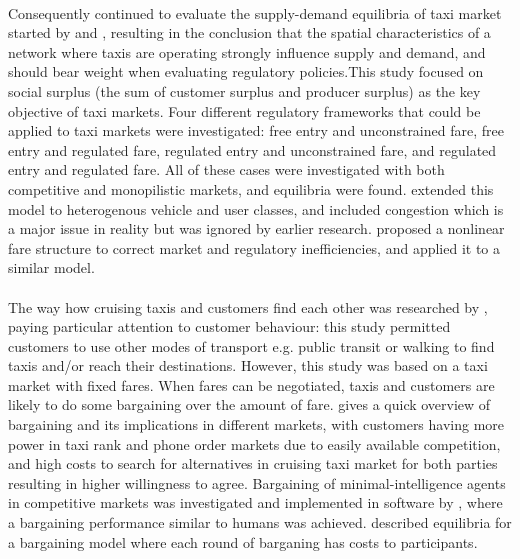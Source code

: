 \paragraph{}Consequently \textcite{Yang2002taxi+demand} continued to evaluate
the supply-demand equilibria of taxi market started by
\textcite{Yang1998taxi+network} and \textcite{Yang2000taxi+utilization},
resulting in the conclusion that the spatial characteristics of a network where
taxis are operating strongly influence supply and demand, and should bear
weight when evaluating regulatory policies.This study focused on social surplus
(the sum of customer surplus and producer surplus) as the key objective of taxi
markets. Four different regulatory frameworks that could be applied to taxi
markets were investigated: free entry and unconstrained fare, free entry and
regulated fare, regulated entry and unconstrained fare, and regulated entry and
regulated fare. All of these cases were investigated with both competitive and
monopilistic markets, and equilibria were found.
\textcite{Wong2008taxi+modeling} extended this model to heterogenous vehicle
and user classes, and included congestion which is a major issue in reality but
was ignored by earlier research. \textcite{Yang2010taxi+nonlinear} proposed a
nonlinear fare structure to correct market and regulatory inefficiencies, and
applied it to a similar model.

\paragraph{} The way how cruising taxis and customers find each other was
researched by \textcite{Yang2010taxi+equilibria}, paying particular attention
to customer behaviour: this study permitted customers to use other modes of
transport e.g. public transit or walking to find taxis and/or reach their
destinations. However, this study was based on a taxi market with fixed fares.
When fares can be negotiated, taxis and customers are likely to do some
bargaining over the amount of fare. \textcite{Cairns1996taxi+competition} gives
a quick overview of bargaining and its implications in different markets, with
customers having more power in taxi rank and phone order markets due to easily
available competition, and high costs to search for alternatives in cruising
taxi market for both parties resulting in higher willingness to agree.
Bargaining of minimal-intelligence agents in competitive markets was
investigated and implemented in software by \textcite{Cli1997taxi+bargaining},
where a bargaining performance similar to humans was achieved.
\textcite{Rubinstein1982taxi+bargaining} described equilibria for a bargaining
model where each round of barganing has costs to participants.

